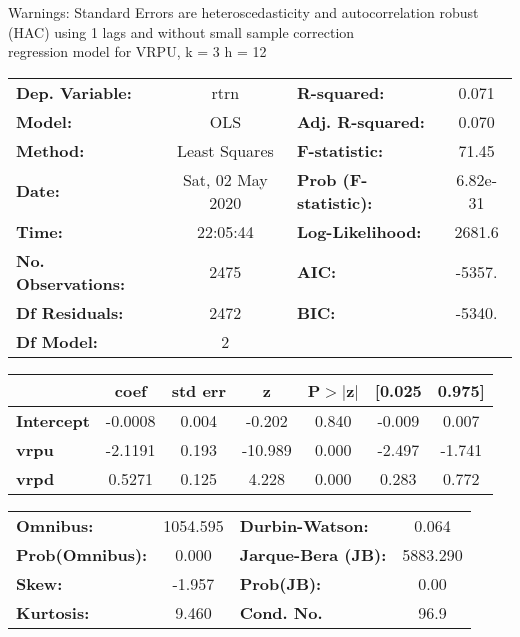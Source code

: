 Warnings: \newline
 [1] Standard Errors are heteroscedasticity and autocorrelation robust (HAC) using 1 lags and without small sample correction\\ 

regression model for VRPU, k = 3 h = 12\begin{center}
\begin{tabular}{lclc}
\toprule
\textbf{Dep. Variable:}    &       rtrn       & \textbf{  R-squared:         } &     0.071   \\
\textbf{Model:}            &       OLS        & \textbf{  Adj. R-squared:    } &     0.070   \\
\textbf{Method:}           &  Least Squares   & \textbf{  F-statistic:       } &     71.45   \\
\textbf{Date:}             & Sat, 02 May 2020 & \textbf{  Prob (F-statistic):} &  6.82e-31   \\
\textbf{Time:}             &     22:05:44     & \textbf{  Log-Likelihood:    } &    2681.6   \\
\textbf{No. Observations:} &        2475      & \textbf{  AIC:               } &    -5357.   \\
\textbf{Df Residuals:}     &        2472      & \textbf{  BIC:               } &    -5340.   \\
\textbf{Df Model:}         &           2      & \textbf{                     } &             \\
\bottomrule
\end{tabular}
\begin{tabular}{lcccccc}
                   & \textbf{coef} & \textbf{std err} & \textbf{z} & \textbf{P$> |$z$|$} & \textbf{[0.025} & \textbf{0.975]}  \\
\midrule
\textbf{Intercept} &      -0.0008  &        0.004     &    -0.202  &         0.840        &       -0.009    &        0.007     \\
\textbf{vrpu}      &      -2.1191  &        0.193     &   -10.989  &         0.000        &       -2.497    &       -1.741     \\
\textbf{vrpd}      &       0.5271  &        0.125     &     4.228  &         0.000        &        0.283    &        0.772     \\
\bottomrule
\end{tabular}
\begin{tabular}{lclc}
\textbf{Omnibus:}       & 1054.595 & \textbf{  Durbin-Watson:     } &    0.064  \\
\textbf{Prob(Omnibus):} &   0.000  & \textbf{  Jarque-Bera (JB):  } & 5883.290  \\
\textbf{Skew:}          &  -1.957  & \textbf{  Prob(JB):          } &     0.00  \\
\textbf{Kurtosis:}      &   9.460  & \textbf{  Cond. No.          } &     96.9  \\
\bottomrule
\end{tabular}
\end{center}

